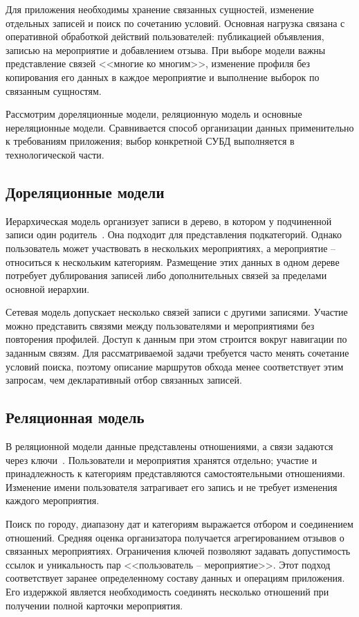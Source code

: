 Для приложения необходимы хранение связанных сущностей, изменение отдельных записей и поиск по сочетанию условий. Основная нагрузка связана с оперативной обработкой действий пользователей: публикацией объявления, записью на мероприятие и добавлением отзыва. При выборе модели важны представление связей <<многие ко многим>>, изменение профиля без копирования его данных в каждое мероприятие и выполнение выборок по связанным сущностям.

Рассмотрим дореляционные модели, реляционную модель и основные нереляционные модели. Сравнивается способ организации данных применительно к требованиям приложения; выбор конкретной СУБД выполняется в технологической части.

\subsection{Дореляционные модели}

Иерархическая модель организует записи в дерево, в котором у подчиненной записи один родитель~\cite{data-modeling}. Она подходит для представления подкатегорий. Однако пользователь может участвовать в нескольких мероприятиях, а мероприятие -- относиться к нескольким категориям. Размещение этих данных в одном дереве потребует дублирования записей либо дополнительных связей за пределами основной иерархии.

Сетевая модель допускает несколько связей записи с другими записями. Участие можно представить связями между пользователями и мероприятиями без повторения профилей. Доступ к данным при этом строится вокруг навигации по заданным связям. Для рассматриваемой задачи требуется часто менять сочетание условий поиска, поэтому описание маршрутов обхода менее соответствует этим запросам, чем декларативный отбор связанных записей.

\subsection{Реляционная модель}

В реляционной модели данные представлены отношениями, а связи задаются через ключи~\cite{data-modeling}. Пользователи и мероприятия хранятся отдельно; участие и принадлежность к категориям представляются самостоятельными отношениями. Изменение имени пользователя затрагивает его запись и не требует изменения каждого мероприятия.

Поиск по городу, диапазону дат и категориям выражается отбором и соединением отношений. Средняя оценка организатора получается агрегированием отзывов о связанных мероприятиях. Ограничения ключей позволяют задавать допустимость ссылок и уникальность пар <<пользователь -- мероприятие>>. Этот подход соответствует заранее определенному составу данных и операциям приложения. Его издержкой является необходимость соединять несколько отношений при получении полной карточки мероприятия.

